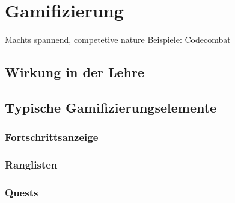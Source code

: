 \chapter{Gamifizierung}
\label{cha:Gamifizierungselemente}
Machts spannend, competetive nature
Beispiele: Codecombat

\section{Wirkung in der Lehre}

\section{Typische Gamifizierungselemente}
\subsection{Fortschrittsanzeige}
\subsection{Ranglisten}
\subsection{Quests}





